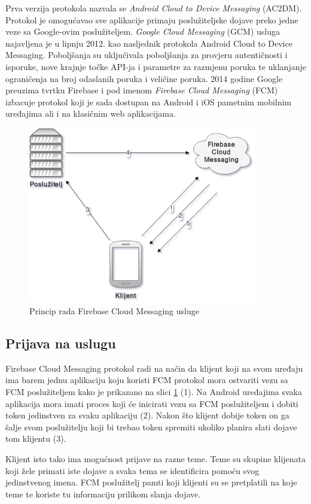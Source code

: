 \documentclass[times, utf8, zavrsni]{fer}
\begin{document}
{Prva verzija protokola nazvala se {\em Android Cloud to Device Messaging} (AC2DM). Protokol je omogućavao sve aplikacije primaju poslužiteljske dojave preko jedne veze sa Google-ovim poslužiteljem. {\em Google Cloud Messaging} (GCM) usluga najavljena je u lipnju 2012. kao nasljednik protokola Android Cloud to Device Messaging. Poboljšanja su uključivala poboljšanja za provjeru autentičnosti i isporuke, nove krajnje točke API-ja i parametre za razmjenu poruka te uklanjanje ograničenja na broj odaslanih poruka i veličine poruka. 2014 godine Google preuzima tvrtku Firebase i pod imenom {\em Firebase Cloud Messaging} (FCM) izbacuje protokol koji je sada dostupan na Android i iOS pametnim mobilnim uređajima ali i na klasičnim web aplikacijama.

\begin{figure}[htb]
\centering
\includegraphics[width=10cm]{img/fcm.png}
\caption{Princip rada Firebase Cloud Messaging usluge}
\label{fig:fcm-image}
\end{figure}

\subsection{Prijava na uslugu}
Firebase Cloud Messaging protokol radi na način da klijent koji na svom uređaju ima barem jednu aplikaciju koju koristi FCM protokol mora ostvariti vezu sa FCM poslužiteljem kako je prikazano na slici \ref{fig:fcm-image} (1). Na Android uređajima svaka aplikacija mora imati proces koji će inicirati vezu sa FCM poslužiteljem i dobiti token jedinstven za svaku aplikaciju (2). Nakon što klijent dobije token on ga šalje svom poslužitelju koji bi trebao token spremiti ukoliko planira slati dojave tom klijentu (3). 

Klijent isto tako ima mogućnost prijave na razne teme. Teme su skupine klijenata koji žele primati iste dojave a svaka tema se identificira pomoću svog jedinstvenog imena. FCM poslužitelj pamti koji klijenti su se pretplatili na koje teme te koriste tu informaciju prilikom slanja dojave.

}
\end{document}
